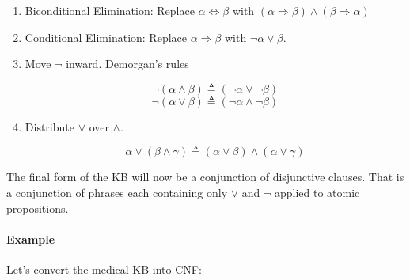 \documentclass[11pt]{article}
\begin{document}
\begin{enumerate}
\item Biconditional Elimination: Replace $\alpha \Leftrightarrow \beta$ with $(\alpha \Rightarrow \beta) \land(\beta \Rightarrow \alpha)$  
\item Conditional Elimination: Replace $\alpha \Rightarrow \beta$ with $\lnot \alpha \lor \beta$.
\item Move $\lnot$ inward. Demorgan's rules 

\[ \lnot (\alpha \land \beta) \triangleq (\lnot \alpha \lor \lnot \beta) \] 
\[ \lnot (\alpha \lor \beta) \triangleq (\lnot \alpha \land \lnot \beta) \] 
\item Distribute $\lor$ over $\land$.   

\[ \alpha \lor (\beta \land \gamma) \triangleq (\alpha \lor \beta)\land (\alpha \lor \gamma)\] 
\end{enumerate}

The final form of the KB will now be a conjunction of disjunctive clauses. That is a conjunction of phrases each containing only $\lor$ and $\lnot$ applied to atomic propositions.    


\paragraph{Example}

Let's convert the medical KB into CNF:
\end{document}
